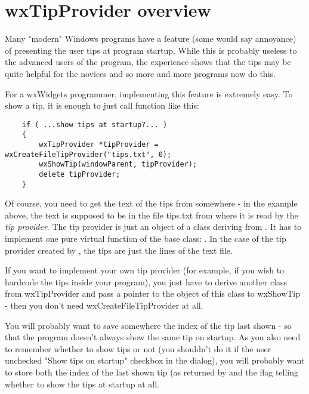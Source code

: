 \section{wxTipProvider overview}\label{tipsoverview}

Many "modern" Windows programs have a feature (some would say annoyance) of
presenting the user tips at program startup. While this is probably useless to
the advanced users of the program, the experience shows that the tips may be
quite helpful for the novices and so more and more programs now do this.

For a wxWidgets programmer, implementing this feature is extremely easy. To
show a tip, it is enough to just call  function
like this:

\begin{verbatim}
    if ( ...show tips at startup?... )
    {
        wxTipProvider *tipProvider = wxCreateFileTipProvider("tips.txt", 0);
        wxShowTip(windowParent, tipProvider);
        delete tipProvider;
    }
\end{verbatim}

Of course, you need to get the text of the tips from somewhere - in the example
above, the text is supposed to be in the file tips.txt from where it is read by
the {\it tip provider}. The tip provider is just an object of a class deriving
from . It has to implement one pure
virtual function of the base class: .
In the case of the tip provider created by 
, the tips are just
the lines of the text file.

If you want to implement your own tip provider (for example, if you wish to
hardcode the tips inside your program), you just have to derive another class
from wxTipProvider and pass a pointer to the object of this class to wxShowTip
- then you don't need wxCreateFileTipProvider at all.

You will probably want to save somewhere the index of the tip last
shown - so that the program doesn't always show the same tip on startup. As you
also need to remember whether to show tips or not (you shouldn't do it if the
user unchecked "Show tips on startup" checkbox in the dialog), you will
probably want to store both the index of the
last shown tip (as returned by 
 and the flag
telling whether to show the tips at startup at all.

